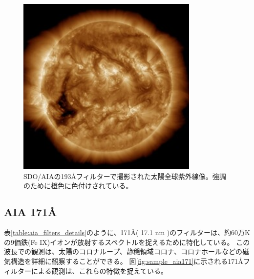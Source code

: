     \begin{figure}[h]
        \centering
        \includegraphics[width=0.8\textwidth]{figures/latest_256_0193.jpg}
        \caption{SDO/AIAの193Åフィルターで撮影された太陽全球紫外線像。強調のために橙色に色付けされている。}
        \label{fig:sample_aia193}
    \end{figure}
    
\subsection{AIA 171Å}
    表\ref{table:aia_filters_details}のように、171Å( 17.1 nm )のフィルターは、約60万Kの9価鉄(Fe IX)イオンが放射するスペクトルを捉えるために特化している。
    この波長での観測は、太陽のコロナループ、静穏領域コロナ、コロナホールなどの磁気構造を詳細に観察することができる。
    図\ref{fig:sample_aia171}に示される171Åフィルターによる観測は、これらの特徴を捉えている。
    
